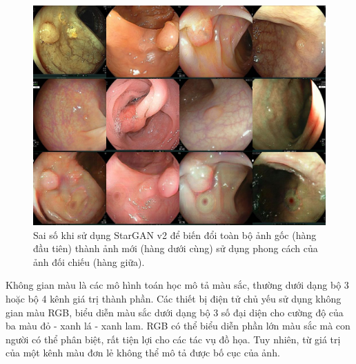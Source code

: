 \documentclass[12pt]{extreport}
\begin{document}
\begin{figure}[H]
    \centering
    \includegraphics[width=0.9\linewidth]{figure28.png}
    \caption{Sai số khi sử dụng StarGAN v2 để biến đổi toàn bộ ảnh gốc (hàng đầu tiên) thành ảnh mới (hàng dưới cùng) sử dụng phong cách của ảnh đối chiếu (hàng giữa).}
\end{figure}

Không gian màu là các mô hình toán học mô tả màu sắc, thường dưới dạng bộ 3 hoặc bộ 4 kênh giá trị thành phần. Các thiết bị điện tử chủ yếu sử dụng không gian màu RGB, biểu diễn màu sắc dưới dạng bộ 3 số đại diện cho cường độ của ba màu đỏ - xanh lá - xanh lam. RGB có thể biểu diễn phần lớn màu sắc mà con người có thể phân biệt, rất tiện lợi cho các tác vụ đồ họa. Tuy nhiên, từ giá trị của một kênh màu đơn lẻ không thể mô tả được bố cục của ảnh.
\end{document}
